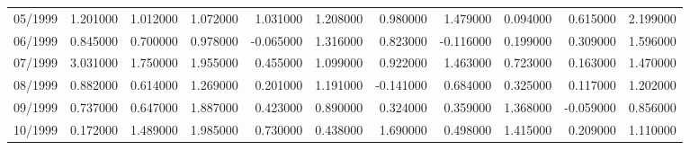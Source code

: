 \begin{tabular}{lrrrrrrrrrr}
05/1999 & 1.201000 & 1.012000 & 1.072000 & 1.031000 & 1.208000 & 0.980000 & 1.479000 & 0.094000 & 0.615000 & 2.199000 \\
06/1999 & 0.845000 & 0.700000 & 0.978000 & -0.065000 & 1.316000 & 0.823000 & -0.116000 & 0.199000 & 0.309000 & 1.596000 \\
07/1999 & 3.031000 & 1.750000 & 1.955000 & 0.455000 & 1.099000 & 0.922000 & 1.463000 & 0.723000 & 0.163000 & 1.470000 \\
08/1999 & 0.882000 & 0.614000 & 1.269000 & 0.201000 & 1.191000 & -0.141000 & 0.684000 & 0.325000 & 0.117000 & 1.202000 \\
09/1999 & 0.737000 & 0.647000 & 1.887000 & 0.423000 & 0.890000 & 0.324000 & 0.359000 & 1.368000 & -0.059000 & 0.856000 \\
10/1999 & 0.172000 & 1.489000 & 1.985000 & 0.730000 & 0.438000 & 1.690000 & 0.498000 & 1.415000 & 0.209000 & 1.110000 \\
\bottomrule
\end{tabular}
